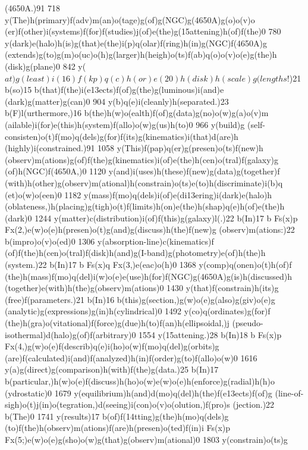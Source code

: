 {{{{{{(4650A.)91 718 y(The)h(primary)f(adv)m(an)o(tage)g(of)g(NGC)g(4650A)g(o)o(v)o
(er)f(other)i(systems)f(for)f(studies)j(of)e(the)g(\015attening)h(of)f(the)0
780 y(dark)e(halo)h(is)g(that)e(the)i(p)q(olar)f(ring)h(in)g(NGC)f(4650A)g
(extends)g(to)g(m)o(uc)o(h)g(larger)h(heigh)o(ts)f(ab)q(o)o(v)o(e)g(the)h
(disk)g(plane)0 842 y(\(at)g(least)i(16)f(kp)q(c)h(or)e(20)h(disk)h(scale)g
(lengths!\))21 b(so)15 b(that)f(the)i(e\013ects)f(of)g(the)g(luminous)i(and)e
(dark)g(matter)g(can)0 904 y(b)q(e)i(cleanly)h(separated.)23
b(F)l(urthermore,)16 b(the)h(w)o(ealth)f(of)g(data)g(no)o(w)g(a)o(v)m
(ailable)i(for)e(this)h(system)f(allo)o(w)g(us)h(to)0 966 y(build)g
(self-consisten)o(t)f(mo)q(dels)g(for)f(its)g(kinematics)i(that)d(are)h
(highly)i(constrained.)91 1058 y(This)f(pap)q(er)g(presen)o(ts)f(new)h
(observ)m(ations)g(of)f(the)g(kinematics)i(of)e(the)h(cen)o(tral)f(galaxy)g
(of)h(NGC)f(4650A,)0 1120 y(and)i(uses)h(these)f(new)g(data)g(together)f
(with)h(other)g(observ)m(ational)h(constrain)o(ts)e(to)h(discriminate)i(b)q
(et)o(w)o(een)0 1182 y(mass)f(mo)q(dels)i(of)e(di\013ering)i(dark)e(halo)h
(oblateness,)h(placing)g(tigh)o(t)f(limits)h(on)e(the)h(shap)q(e)h(of)e(the)h
(dark)0 1244 y(matter)c(distribution)i(of)f(this)g(galaxy)l(.)22
b(In)17 b Fs(x)p Fx(2,)e(w)o(e)h(presen)o(t)g(and)g(discuss)h(the)f(new)g
(observ)m(ations:)22 b(impro)o(v)o(ed)0 1306 y(absorption-line)c(kinematics)f
(of)f(the)h(cen)o(tral)f(disk)h(and)g(I-band)g(photometry)e(of)h(the)h
(system.)22 b(In)17 b Fs(x)q Fx(3,)e(eac)o(h)0 1368 y(comp)q(onen)o(t)h(of)f
(the)h(mass)f(mo)q(del)i(w)o(e)e(use)h(for)f(NGC)g(4650A)g(is)h(discussed)h
(together)e(with)h(the)g(observ)m(ations)0 1430 y(that)f(constrain)h(its)g
(free)f(parameters.)21 b(In)16 b(this)g(section,)g(w)o(e)g(also)g(giv)o(e)g
(analytic)g(expressions)g(in)h(cylindrical)0 1492 y(co)q(ordinates)g(for)f
(the)h(gra)o(vitational)f(force)g(due)h(to)f(an)h(ellipsoidal,)j
(pseudo-isothermal)d(halo)g(of)f(arbitrary)0 1554 y(\015attening.)28
b(In)18 b Fs(x)p Fx(4,)g(w)o(e)f(describ)q(e)i(ho)o(w)f(mo)q(del)g(orbits)g
(are)f(calculated)i(and)f(analyzed)h(in)f(order)g(to)f(allo)o(w)0
1616 y(a)g(direct)g(comparison)h(with)f(the)g(data.)25 b(In)17
b(particular,)h(w)o(e)f(discuss)h(ho)o(w)e(w)o(e)h(enforce)g(radial)h(h)o
(ydrostatic)0 1679 y(equilibrium)h(and)d(mo)q(del)h(the)f(e\013ects)f(of)g
(line-of-sigh)o(t)j(in)o(tegration,)d(seeing)i(con)o(v)o(olution,)f(pro)s
(jection.)22 b(The)0 1741 y(results)17 b(of)f(\014tting)g(the)h(mo)q(dels)g
(to)f(the)h(observ)m(ations)f(are)h(presen)o(ted)f(in)i Fs(x)p
Fx(5;)e(w)o(e)g(sho)o(w)g(that)g(observ)m(ational)0 1803 y(constrain)o(ts)g
}}}}}}
